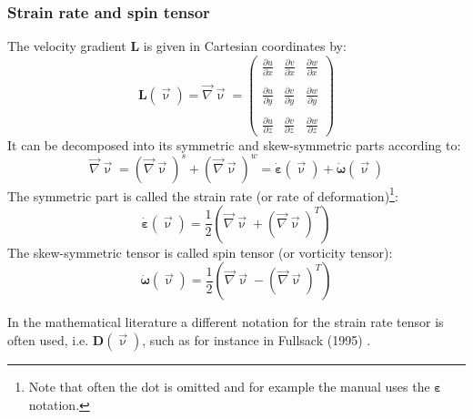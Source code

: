 \subsubsection{Strain rate and spin tensor} \label{ss:srst}

The velocity gradient ${\bm L}$ is given in Cartesian coordinates by:
\begin{equation}
{\bm L}(\vec\upnu)=
\vec\nabla\vec\upnu = 
\left(
\begin{array}{ccc}
\frac{\partial u}{\partial x} & \frac{\partial v}{\partial x} & \frac{\partial w}{\partial x} \\\\
\frac{\partial u}{\partial y} & \frac{\partial v}{\partial y} & \frac{\partial w}{\partial y} \\\\
\frac{\partial u}{\partial z} & \frac{\partial v}{\partial z} & \frac{\partial w}{\partial z} 
\end{array}
\right)
\end{equation}
It can be decomposed into its symmetric and skew-symmetric parts according to:
\begin{equation}
\vec\nabla\vec\upnu = (\vec\nabla\vec\upnu)^s + (\vec\nabla\vec\upnu)^w 
= \dot{\bm \varepsilon}(\vec \upnu) +  \dot{\bm \omega}(\vec \upnu)
\end{equation}
The symmetric part is called the strain rate (or rate of deformation)\footnote{Note that often the dot is omitted and for example the \aspect manual uses the ${\bm \varepsilon}$ notation.}:
\begin{equation}
\dot{\bm \varepsilon}(\vec \upnu) = \frac{1}{2}\left( \vec\nabla\vec\upnu + (\vec\nabla\vec\upnu)^T \right)
\end{equation}
The skew-symmetric tensor is called spin tensor (or vorticity tensor):
\begin{equation}
\dot{\bm \omega}(\vec \upnu) = \frac{1}{2}\left( \vec\nabla\vec\upnu - (\vec\nabla\vec\upnu)^T \right)
\end{equation}

\begin{remark}
In the mathematical literature a different notation for the strain rate tensor is often used, i.e. 
${\bm D}(\vec \upnu)$, such as for instance in Fullsack (1995) \cite{full95}.
\end{remark}


